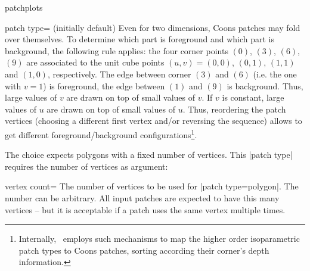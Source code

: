 \begin{pgfplotslibrary}{patchplots}
\begin{pgfplotskey}{patch type= (initially default)}
	Even for two dimensions, Coons patches may fold over themselves. To determine which part is foreground and which part is background, the following rule applies: the four corner points $(0)$, $(3)$, $(6)$, $(9)$ are associated to the unit cube points $(u,v) = (0,0)$, $(0,1)$, $(1,1)$ and $(1,0)$, respectively. The edge between corner $(3)$ and $(6)$ (i.e. the one with $v=1$) is foreground, the edge between $(1)$ and $(9)$ is background. Thus, large values of $v$ are drawn on top of small values of $v$. If $v$ is constant, large values of $u$ are drawn on top of small values of $u$. Thus, reordering the patch vertices (choosing a different first vertex and/or reversing the sequence) allows to get different foreground/background configurations\footnote{Internally, \PGFPlots\ employs such mechanisms to map the higher order isoparametric patch types to Coons patches, sorting according their corner's depth information.}.
	

	The choice  expects polygons with a fixed number of vertices. This |patch type| requires the number of vertices as argument:
	\begin{pgfplotskey}{vertex count=}
		The number of vertices to be used for |patch type=polygon|. The number can be arbitrary. All input patches are expected to have this many vertices -- but it is acceptable if a patch uses the same vertex multiple times.
		

\end{pgfplotskey}
\end{pgfplotskey}
\end{pgfplotslibrary}

